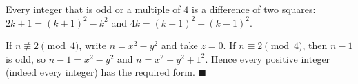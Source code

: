 Every integer that is odd or a multiple of $4$ is a difference of two squares: $2k+1=(k+1)^2-k^2$ and $4k=(k+1)^2-(k-1)^2$.

If $n\not\equiv2\pmod4$, write $n=x^2-y^2$ and take $z=0$. If $n\equiv2\pmod4$, then $n-1$ is odd, so $n-1=x^2-y^2$ and $n=x^2-y^2+1^2$. Hence every positive integer (indeed every integer) has the required form. $\blacksquare$
